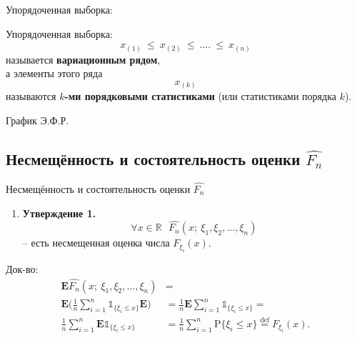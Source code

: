 \begin{frame}{Упорядоченная выборка:}
\begin{definition}
    Упорядоченная выборка:
    $$
    x_{(1)}~\leqslant~x_{(2)}~\leqslant~ ....~\leqslant~ x_{(n)}
    $$
    называется \textbf{вариационным рядом},
    \\
    а элементы этого ряда 
    $$x_{(k)}$$
    называются  \textbf{ $k$-ми порядковыми статистиками} (или статистиками порядка $k$).
\end{definition}

\end{frame}


\begin{frame}{График Э.Ф.Р.}

    
\end{frame}{}


\subsection{Несмещённость и состоятельность оценки $\hat{F_n}$}


\begin{frame}{Несмещённость и состоятельность оценки $\hat{F_n}$}
\begin{enumerate}
    \item 
    \textbf{Утверждение 1.~~}
 $$\forall x \in  \mathbb{R} ~~~\hat{F_n}(x;~ \xi_1,\xi_2,...,\xi_n)$$ --
есть
несмещенная оценка числа $F_{\xi_i}(x)$.
\end{enumerate}
Док-во:
\begin{align*}
\mathrm{\mathbf{E}} \hat{F_n}(x;~ \xi_1,\xi_2,...,\xi_n) & =
\\
\mathrm{\mathbf{E}} \bigg( \frac{1}{n}\sum_{i=1}^n
         \mathds{1}_{\{\xi_i \leqslant x \}} \mathrm{\mathbf{E}} \bigg) & =
\frac{1}{n} \mathrm{\mathbf{E}} \sum_{i=1}^n
         \mathds{1}_{\{\xi_i \leqslant x \}}  =
         \\
\frac{1}{n}  \sum_{i=1}^n
         \mathrm{\mathbf{E}} \mathds{1}_{\{\xi_i \leqslant x \}} & =
        \frac{1}{n}  \sum_{i=1}^n
         \mathrm{P} \{\xi_i \leqslant x \}  
         \overset{\mathrm{def}}{=}
         F_{\xi_i}(x).
\end{align*}


\end{frame}{}

